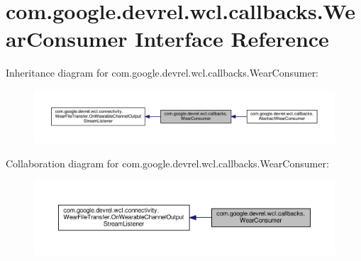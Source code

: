 \hypertarget{interfacecom_1_1google_1_1devrel_1_1wcl_1_1callbacks_1_1WearConsumer}{}\section{com.\+google.\+devrel.\+wcl.\+callbacks.\+Wear\+Consumer Interface Reference}
\label{interfacecom_1_1google_1_1devrel_1_1wcl_1_1callbacks_1_1WearConsumer}


Inheritance diagram for com.\+google.\+devrel.\+wcl.\+callbacks.\+Wear\+Consumer\+:
\nopagebreak
\begin{figure}[H]
\begin{center}
\leavevmode
\includegraphics[width=350pt]{dc/d4b/interfacecom_1_1google_1_1devrel_1_1wcl_1_1callbacks_1_1WearConsumer__inherit__graph}
\end{center}
\end{figure}


Collaboration diagram for com.\+google.\+devrel.\+wcl.\+callbacks.\+Wear\+Consumer\+:
\nopagebreak
\begin{figure}[H]
\begin{center}
\leavevmode
\includegraphics[width=350pt]{dd/df2/interfacecom_1_1google_1_1devrel_1_1wcl_1_1callbacks_1_1WearConsumer__coll__graph}
\end{center}
\end{figure}

